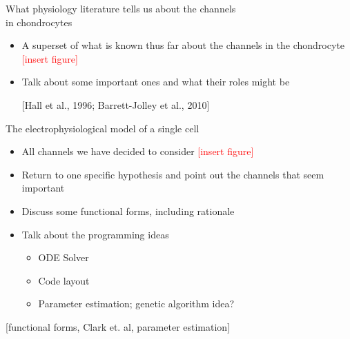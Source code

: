 \documentclass[ignorenonframetext]{beamer}
\newcommand{\references}[1] {
  \begin{flushright}
    \scriptsize [#1] \normalsize
  \end{flushright}
}
\newcommand{\addfigure} {
  \scriptsize
  \textcolor{red}{[insert figure]}
  \normalsize
}
\begin{document}
%
%
%

\begin{frame}{What physiology literature tells us about the channels\\
    in chondrocytes}

  \begin{itemize}
  \item A superset of what is known thus far about the channels in the
    chondrocyte \addfigure
  \item Talk about some important ones and what their roles might be

    \references{Hall et al., 1996; Barrett-Jolley et al., 2010}

  \end{itemize}

\end{frame}

%

\begin{frame}{The electrophysiological model of a single cell}

  \begin{itemize}
  \item All channels we have decided to consider \addfigure %
  \item Return to one specific hypothesis and point out the channels
    that seem important %
  \item Discuss some functional forms, including rationale
  \item Talk about the programming ideas
    \begin{itemize}
      \item ODE Solver
      \item Code layout
      \item Parameter estimation; genetic algorithm idea?
    \end{itemize}
  \end{itemize}

  \references{functional forms, Clark et. al, parameter estimation}

\end{frame}
\end{document}
